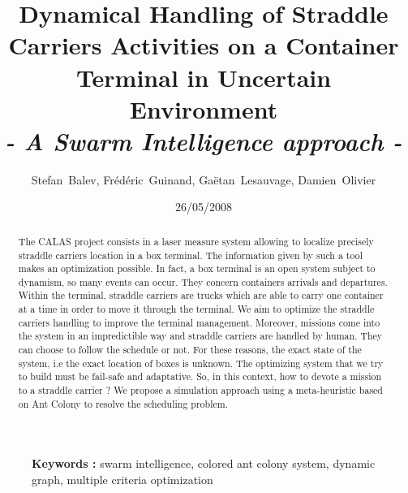 \documentclass[a4paper,10pt]{article}
\date{26/05/2008}
\begin{document}
	\begin{titlepage}
 		\title{Dynamical Handling of Straddle Carriers Activities on a Container Terminal in Uncertain Environment \\ \textit{- A Swarm Intelligence approach -}}
		
		\author{Stefan~Balev, Fr\'{e}d\'{e}ric~Guinand, Ga\"{e}tan~Lesauvage, Damien~Olivier}
			
	\end{titlepage}
	\maketitle
	
	\begin{abstract}

	 The CALAS project consists in a laser measure system allowing to localize precisely straddle carriers location in a box terminal. The information given by such a tool makes an optimization possible. In fact, a box terminal is an open system subject to dynamism, so many events can occur. They concern containers arrivals and departures. Within the terminal, straddle carriers are trucks which are able to carry one container at a time in order to move it through the terminal. We aim to optimize the straddle carriers handling to improve the terminal management. Moreover, missions come into the system in an impredictible way and straddle carriers are handled by human. They can choose to follow the schedule or not. For these reasons, the exact state of the system, i.e the exact location of boxes is unknown. The optimizing system that we try to build must be fail-safe and adaptative. So, in this context, how to devote a mission to a straddle carrier ? We propose a simulation approach using a meta-heuristic based on Ant Colony to resolve the scheduling problem.
	\\
	\end{abstract}
	

	
	\begin{figure}[h]
	 
	\textbf{Keywords : } swarm intelligence, colored ant colony system, dynamic graph, multiple criteria optimization
	
	\end{figure}
\end{document}
